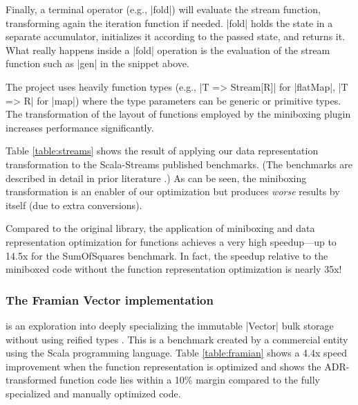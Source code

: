 Finally, a terminal operator (e.g., |fold|) will evaluate the stream function, transforming again the iteration function if needed. |fold| holds the state in a separate accumulator, initializes it according to the passed state, and returns it. What really happens inside a |fold| operation is the evaluation of the stream function such as |gen| in the snippet above.

The project uses heavily function types (e.g., |T => Stream[R]| for |flatMap|, |T => R| for |map|) where the type parameters can be generic or primitive types. The transformation of the layout of functions employed by the miniboxing plugin increases performance significantly.


Table \ref{table:streams} shows the result of applying our data
representation transformation to the Scala-Streams published
benchmarks. (The benchmarks are described in detail in prior
literature \cite{biboudis_clash_2014}.) As can be seen, the miniboxing
transformation is an enabler of our optimization but produces
\emph{worse} results by itself (due to extra conversions).

Compared to the original library, the application of miniboxing and
data representation optimization for functions achieves a very high
speedup---up to 14.5x for the SumOfSquares benchmark. In fact, the
speedup relative to the miniboxed code without the function
representation optimization is nearly 35x!



\subsubsection{The Framian Vector implementation} is an exploration into deeply specializing the immutable |Vector| bulk storage without using reified types \cite{tixxit-respecialization15,tixxit-respecialization6}. This is a benchmark created by a commercial entity using the Scala programming language. Table \ref{table:framian} shows a 4.4x speed improvement when the function representation is optimized and shows the ADR-transformed function code lies within a 10\% margin compared to the fully specialized and manually optimized code.

